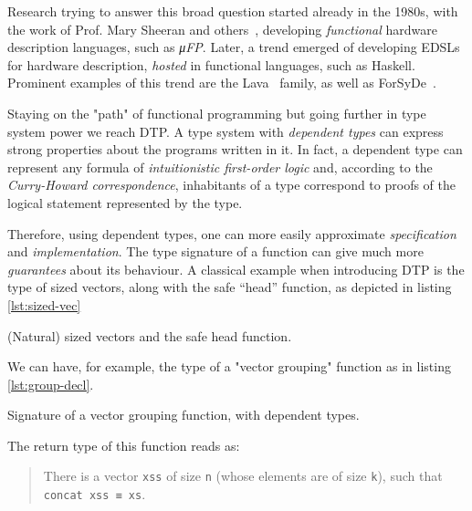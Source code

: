     Research trying to answer this broad question started already in the 1980s,
    with the work of Prof. Mary Sheeran and others~\cite{sheeran-survey},
    developing \emph{functional} hardware description languages, such as \emph{μFP}.
    Later, a trend emerged of developing \acp{EDSL} for hardware description,
    \emph{hosted} in functional languages, such as Haskell.
    Prominent examples of this trend are the Lava~\cite{lava-1999} family,
    as well as ForSyDe~\cite{forsyde1999}.

    Staying on the "path" of functional programming but going further in type system power we reach \ac{DTP}.
    A type system with \emph{dependent types} can express strong properties about the programs written in it.
    In fact, a dependent type can represent any formula of \emph{intuitionistic first-order logic} and,
    according to the \emph{Curry-Howard correspondence},
    inhabitants of a type correspond to proofs of the logical statement represented by the type.

    Therefore, using dependent types,
    one can more easily approximate \emph{specification} and \emph{implementation}.
    The type signature of a function can give much more \emph{guarantees} about its behaviour.
    A classical example when introducing \ac{DTP} is the type of sized vectors,
    along with the safe ``head'' function, as depicted in listing \ref{lst:sized-vec}
    \begin{listing}[h]
        \caption{(Natural) sized vectors and the safe head function. \label{lst:sized-vec}}
    \end{listing}

    We can have, for example, the type of a "vector grouping" function as in listing \ref{lst:group-decl}.
    \begin{listing}[h]
        \caption{Signature of a vector grouping function, with dependent types. \label{lst:group-decl}}
    \end{listing}

    The return type of this function reads as:
    \begin{quote}
        There is a vector \texttt{xss} of size \texttt{n}
        (whose elements are of size \texttt{k}), such that \texttt{concat xss ≡ xs}.
    \end{quote}

